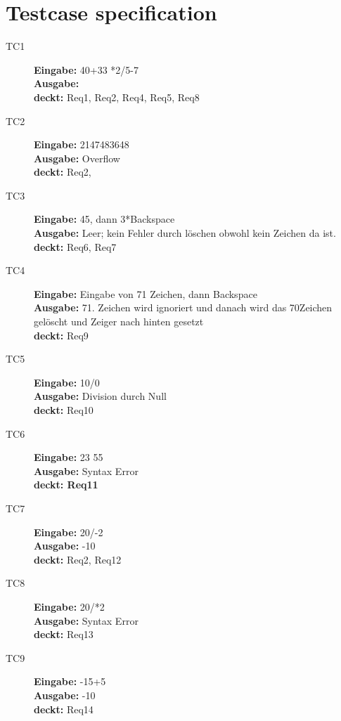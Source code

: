 \section{Testcase specification}

\begin{description}
 \item[TC1] \textbf{Eingabe:} 40+33 *2/5-7\\
  \textbf{Ausgabe:} \\
  \textbf{deckt:} Req1, Req2, Req4, Req5, Req8

 \item[TC2] \textbf{Eingabe:} 2147483648\\
  \textbf{Ausgabe:} Overflow\\
  \textbf{deckt:} Req2,

\item[TC3] \textbf{Eingabe:} 45, dann 3*Backspace\\
  \textbf{Ausgabe:} Leer; kein Fehler durch löschen obwohl kein Zeichen da ist.\\
  \textbf{deckt:} Req6, Req7

\item[TC4] \textbf{Eingabe:} Eingabe von 71 Zeichen, dann Backspace\\
  \textbf{Ausgabe:} 71. Zeichen wird ignoriert und danach wird das 70Zeichen gelöscht und Zeiger nach hinten gesetzt\\
  \textbf{deckt:} Req9

 \item[TC5] \textbf{Eingabe:} 10/0\\
  \textbf{Ausgabe:} Division durch Null\\
  \textbf{deckt:} Req10

 \item[TC6] \textbf{Eingabe:} 23 55\\
  \textbf{Ausgabe:} Syntax Error\\
  \textbf{deckt: Req11}

 \item[TC7] \textbf{Eingabe:} 20/-2\\
  \textbf{Ausgabe:} -10\\
  \textbf{deckt:} Req2, Req12

 \item[TC8] \textbf{Eingabe:} 20/*2\\
  \textbf{Ausgabe:} Syntax Error\\
  \textbf{deckt:} Req13

 \item[TC9] \textbf{Eingabe:} -15+5\\
  \textbf{Ausgabe:} -10\\
  \textbf{deckt:} Req14


\end{description}
